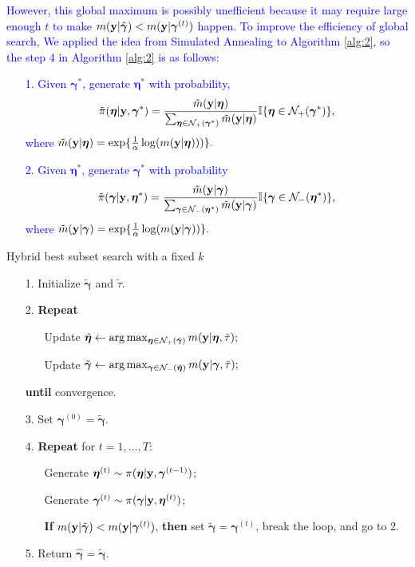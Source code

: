 \documentclass[12pt]{article}
\def\uy{{\bf y}}
\def\bg{{\boldsymbol \gamma}}
\def\ueta{{\boldsymbol \eta}}
\def\ueta{{\boldsymbol \eta}}
\begin{document}
\textcolor{blue}{However, this global maximum is possibly unefficient because it may require large enough $t$ to make $m(\uy|\hat{\bg})<m(\uy|\bg^{(t)})$ happen. To improve the efficiency of global search, We applied the idea from Simulated Annealing to Algorithm \ref{alg:2}, so the step 4 in Algorithm \ref{alg:2} is as follows:
\begin{itemize}
 \item[1.] Given $\bg^*$, generate $\ueta^*$ with probability,
       $$\tilde{\pi}(\ueta|\uy,\bg^*)=\frac{\tilde{m}(\uy|\ueta)}{\sum_{\ueta \in \mathcal{N}_+(\bg^* )  } \tilde{m}(\uy|\ueta) }\mathbb{I}\{\ueta \in \mathcal{N}_+(\bg^* ) \},$$ where $\tilde{m}(\uy|\ueta)=\exp\{\frac{1}{\alpha}\log(m(\uy|\ueta)))\}.$ \\
 \item[2.] Given $\ueta^*$, generate $\bg^*$ with probability
       $$\tilde{\pi}(\bg|\uy,\ueta^*)=\frac{\tilde{m}(\uy|\bg)}{\sum_{\bg \in \mathcal{N}_-({\ueta}^* )  } \tilde{m}(\uy|\bg) }\mathbb{I}\{\bg \in \mathcal{N}_-({\ueta}^* )  \},$$ where $\tilde{m}(\uy|\bg)=\exp\{\frac{1}{\alpha}\log(m(\uy|\bg))\}.$
\end{itemize}
}

\begin{algorithm}[ht]
 \caption{Hybrid best subset search with a fixed $k$}\label{alg:2}
 \begin{itemize}
  \item[1.] Initialize $\tilde{\bg}$ and $\tilde{\tau}$.
  \item[2.] \textbf{Repeat}
        \begin{itemize}
         \item[] Update $\tilde{\ueta}\leftarrow \arg\max_{\ueta  \in \mathcal{N}_+(\tilde{\bg} ) } m(\uy|\ueta,\tilde{\tau});$
         \item[] Update $\tilde{\bg}\leftarrow  \arg\max_{\bg  \in \mathcal{N}_-(\tilde{\ueta} ) } m(\uy|\bg,\tilde{\tau});$
        \end{itemize}
  \item[] \textbf{until} convergence.
  \item[3.] Set $\bg^{(0)}=\tilde{\bg}$.
  \item[4.] \textbf{Repeat} for $t=1,\ldots,T$:
        \begin{itemize}
         \item[] Generate $\ueta^{(t)}\sim \pi(\ueta|\uy,\bg^{(t-1)})$;
         \item[] Generate $\bg^{(t)}\sim \pi(\bg|\uy,\ueta^{(t)})$;
         \item[] \textbf{If} $m(\uy|\tilde{\bg})<m(\uy|\bg^{(t)})$, \textbf{then} set $\tilde{\bg}=\bg^{(t)}$, break the loop, and go to 2.
        \end{itemize}
  \item[5.] Return $\hat{\bg}=\tilde{\bg}$.
 \end{itemize}
\end{algorithm}
\end{document}
